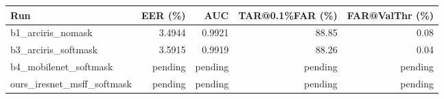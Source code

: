 \begin{tabular}{lrrrr}
\hline
Run & EER (\%) & AUC & TAR@0.1\%FAR (\%) & FAR@ValThr (\%) \\
\hline
b1_arciris_nomask & 3.4944 & 0.9921 & 88.85 & 0.08 \\
b3_arciris_softmask & 3.5915 & 0.9919 & 88.26 & 0.04 \\
b4_mobilenet_softmask & pending & pending & pending & pending \\
ours_iresnet_msff_softmask & pending & pending & pending & pending \\
\hline
\end{tabular}
